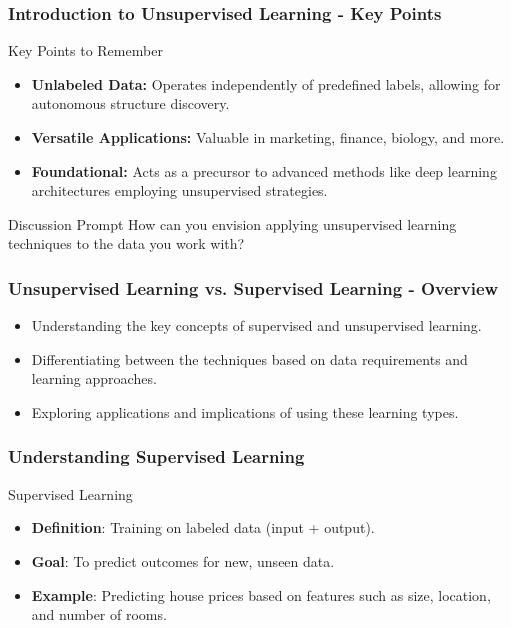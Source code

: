 \documentclass[aspectratio=169]{beamer}
\begin{document}
\begin{frame}[fragile]
    \frametitle{Introduction to Unsupervised Learning - Key Points}
    
    \begin{block}{Key Points to Remember}
        \begin{itemize}
            \item \textbf{Unlabeled Data:} Operates independently of predefined labels, allowing for autonomous structure discovery.
            \item \textbf{Versatile Applications:} Valuable in marketing, finance, biology, and more.
            \item \textbf{Foundational:} Acts as a precursor to advanced methods like deep learning architectures employing unsupervised strategies.
        \end{itemize}
    \end{block}
    
    \begin{block}{Discussion Prompt}
        How can you envision applying unsupervised learning techniques to the data you work with?
    \end{block}
\end{frame}

\begin{frame}[fragile]
    \frametitle{Unsupervised Learning vs. Supervised Learning - Overview}
    \begin{itemize}
        \item Understanding the key concepts of supervised and unsupervised learning.
        \item Differentiating between the techniques based on data requirements and learning approaches.
        \item Exploring applications and implications of using these learning types.
    \end{itemize}
\end{frame}

\begin{frame}[fragile]
    \frametitle{Understanding Supervised Learning}
    \begin{block}{Supervised Learning}
        \begin{itemize}
            \item \textbf{Definition}: Training on labeled data (input + output).
            \item \textbf{Goal}: To predict outcomes for new, unseen data.
            \item \textbf{Example}: Predicting house prices based on features such as size, location, and number of rooms.
        \end{itemize}
    \end{block}
\end{frame}
\end{document}
